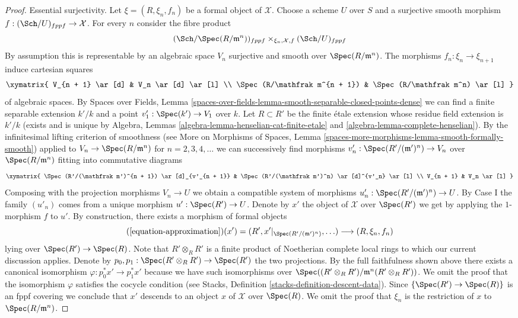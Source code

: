 \begin{proof}
\medskip\noindent
Essential surjectivity. Let $\xi = (R, \xi_n, f_n)$ be a formal object of
$\mathcal{X}$. Choose a scheme $U$ over $S$ and a surjective smooth morphism
$f : (\Sch/U)_{fppf} \to \mathcal{X}$. For every $n$ consider the fibre product
$$
(\Sch/\Spec(R/\mathfrak m^n))_{fppf}
\times_{\xi_n, \mathcal{X}, f}
(\Sch/U)_{fppf}
$$
By assumption this is representable by an algebraic space $V_n$ surjective and
smooth over $\Spec(R/\mathfrak m^n)$. The morphisms
$f_n : \xi_n \to \xi_{n + 1}$ induce cartesian squares
$$
\xymatrix{
V_{n + 1} \ar[d] & V_n \ar[d] \ar[l] \\
\Spec(R/\mathfrak m^{n + 1}) & \Spec(R/\mathfrak m^n) \ar[l]
}
$$
of algebraic spaces. By Spaces over Fields, Lemma
\ref{spaces-over-fields-lemma-smooth-separable-closed-points-dense}
we can find a finite separable extension $k'/k$ and a point
$v'_1 : \Spec(k') \to V_1$ over $k$. Let $R \subset R'$ be the finite \'etale
extension whose residue field extension is $k'/k$ (exists and
is unique by
Algebra, Lemmas \ref{algebra-lemma-henselian-cat-finite-etale} and
\ref{algebra-lemma-complete-henselian}).
By the infinitesimal lifting criterion of smoothness (see
More on Morphisms of Spaces, Lemma
\ref{spaces-more-morphisms-lemma-smooth-formally-smooth})
applied to $V_n \to \Spec(R/\mathfrak m^n)$ for $n = 2, 3, 4, \ldots$
we can successively find morphisms
$v'_n : \Spec(R'/(\mathfrak m')^n) \to V_n$ over $\Spec(R/\mathfrak m^n)$
fitting into commutative diagrams
$$
\xymatrix{
\Spec(R'/(\mathfrak m')^{n + 1}) \ar[d]_{v'_{n + 1}} &
\Spec(R'/(\mathfrak m')^n) \ar[d]^{v'_n} \ar[l] \\
V_{n + 1} & V_n \ar[l]
}
$$
Composing with the projection morphisms $V_n \to U$ we obtain a compatible
system of morphisms $u'_n : \Spec(R'/(\mathfrak m')^n) \to U$.
By Case I the family $(u'_n)$ comes from a unique
morphism $u' : \Spec(R') \to U$. Denote by $x'$ the object of $\mathcal{X}$
over $\Spec(R')$ we get by applying the $1$-morphism $f$ to $u'$.
By construction, there exists a morphism of formal objects
$$
(\ref{equation-approximation})(x') =
(R', x'|_{\Spec(R'/(\mathfrak m')^n)}, \ldots)
\longrightarrow
(R, \xi_n, f_n)
$$
lying over $\Spec(R') \to \Spec(R)$. Note that $R' \otimes_R R'$ is a finite
product of Noetherian complete local rings to which our current
discussion applies. Denote by $p_0, p_1 : \Spec(R' \otimes_R R') \to \Spec(R')$
the two projections. By the full faithfulness shown above there exists
a canonical isomorphism $\varphi : p_0^*x' \to p_1^*x'$ because we have
such isomorphisms over
$\Spec((R' \otimes_R R')/\mathfrak m^n(R' \otimes_R R'))$.
We omit the proof that the isomorphism $\varphi$ satisfies the cocycle
condition (see Stacks, Definition \ref{stacks-definition-descent-data}).
Since $\{\Spec(R') \to \Spec(R)\}$ is an fppf covering we conclude
that $x'$ descends to an object $x$ of $\mathcal{X}$ over $\Spec(R)$.
We omit the proof that $\xi_n$ is the restriction of $x$ to
$\Spec(R/\mathfrak m^n)$.
\end{proof}

